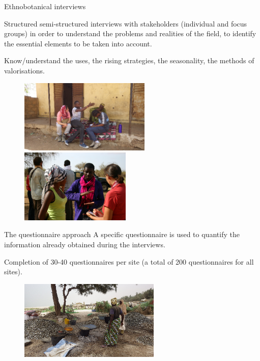 \documentclass[newPxFont]{beamer}
\begin{document}
\begin{frame}[c]{Ethnobotanical interviews}
\vspace{-1cm}

Structured semi-structured interviews with stakeholders (individual and focus groups) in order to understand the problems and realities of the field, to identify the essential elements to be taken into account.

Know/understand the uses, the rising strategies, the seasonality, the methods of valorisations.


\begin{figure}
	\hspace{-1.5em}
	\includegraphics[height = 3.5cm]{img/group3.png}~
  \includegraphics[height = 3.5cm]{img/group2.png}
\end{figure}
\end{frame}

\begin{frame}[c]{The questionnaire approach}
\vspace{-1cm}
A specific questionnaire is used to quantify the information already obtained during the interviews.

Completion of 30-40 questionnaires per site (a total of 200 questionnaires for all sites).
\begin{figure}
	\centering
	\includegraphics[width = 0.6\textwidth]{img/Khoudia.png}
\end{figure}

\end{frame}
\end{document}
